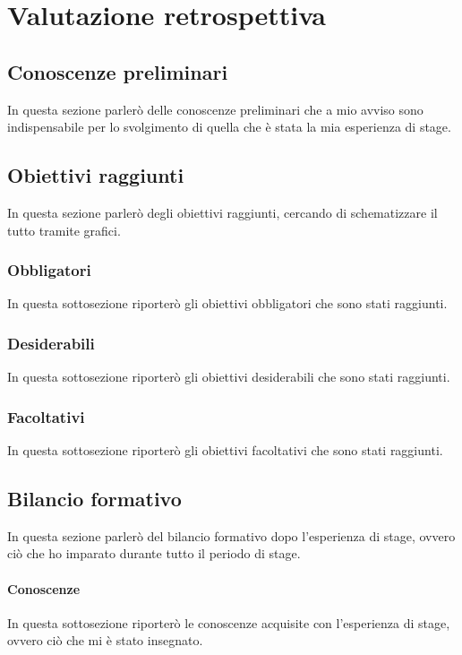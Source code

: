 
\chapter{Valutazione retrospettiva}

\section{Conoscenze preliminari}
In questa sezione parlerò delle conoscenze preliminari che a mio avviso sono indispensabile per lo svolgimento di quella che è stata la mia esperienza di stage.

\section{Obiettivi raggiunti}
In questa sezione parlerò degli obiettivi raggiunti, cercando di schematizzare il tutto tramite grafici.

\subsection{Obbligatori}
In questa sottosezione riporterò gli obiettivi obbligatori che sono stati raggiunti.

\subsection{Desiderabili}
In questa sottosezione riporterò gli obiettivi desiderabili che sono stati raggiunti.

\subsection{Facoltativi}
In questa sottosezione riporterò gli obiettivi facoltativi che sono stati raggiunti.

\section{Bilancio formativo}
In questa sezione parlerò del bilancio formativo dopo l'esperienza di stage, ovvero ciò che ho imparato durante tutto il periodo di stage.

\subsubsection{Conoscenze}
In questa sottosezione riporterò le conoscenze acquisite con l'esperienza di stage, ovvero ciò che mi è stato insegnato.

